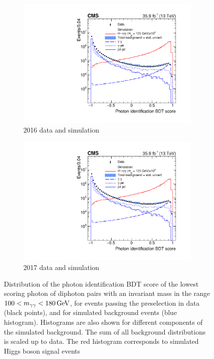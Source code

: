 \begin{figure}[h!]
  \centering
  \begin{subfigure}{0.49\textwidth}
    \includegraphics[width=\textwidth]{Figures/Objects/IDMVA_2016}
    \caption{2016 data and simulation}
    \label{fig:obj_IDMVA_2016}
  \end{subfigure}
  \begin{subfigure}{0.49\textwidth}
    \includegraphics[width=\textwidth]{Figures/Objects/IDMVA_2016}
    \caption{2017 data and simulation}
    \label{fig:obj_IDMVA_2016}
  \end{subfigure}
  \caption{Distribution of the photon identification BDT score of the lowest scoring photon
  of diphoton pairs with an invariant mass in the range $100 < m_{\gamma\gamma} < \SI{180}{GeV}$, for events passing
  the preselection in data (black points), and for simulated background events (blue
  histogram). Histograms are also shown for different components of the simulated background.
  The sum of all background distributions is scaled up to data. The red histogram corresponds
  to simulated Higgs boson signal events}
  \label{fig:obj_IDMVA}
\end{figure}

